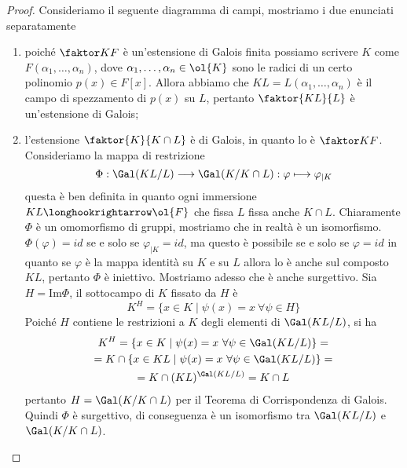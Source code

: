 \documentclass[11pt]{scrartcl}
\begin{document}
	\begin{proof}
		Consideriamo il seguente diagramma di campi, mostriamo i due enunciati separatamente
		\begin{center}
		\end{center}
		\begin{enumerate}[(1)]
			\item poiché $\faktor K F$ è un'estensione di Galois finita possiamo scrivere
			$K$ come $F(\alpha_1, \ldots, \alpha_n)$, dove $\alpha_1, \ldots, \alpha_n \in \ol{K}$
			sono le radici di un certo polinomio $p(x) \in F[x]$. Allora abbiamo che
			$KL = L(\alpha_1, \ldots, \alpha_n)$ è il campo di spezzamento di 
			$p(x)$ su $L$, pertanto $\faktor{KL}{L}$ è un'estensione di Galois;
			\item l'estensione $\faktor{K}{K\cap L}$ è di Galois, in quanto lo è $\faktor K F$. Consideriamo la mappa di restrizione
			\[
			\Phi: \Gal(KL/L) \longrightarrow \Gal(K/K\cap L): \varphi\longmapsto \varphi_{\mid K}
			\]
			questa è ben definita in quanto ogni immersione $KL \longhookrightarrow \ol{F}$
			che fissa $L$ fissa anche $K\cap L$. Chiaramente $\Phi$ è un omomorfismo di gruppi, mostriamo che in realtà è un isomorfismo.
			$\Phi(\varphi) = id$ se e solo se $\varphi_{\mid K} = id$, ma questo è possibile se e solo se $\varphi = id$ in quanto se 
			$\varphi$ è la mappa identità su $K$ e su $L$ allora lo è anche sul composto $KL$, pertanto $\Phi$ è iniettivo. Mostriamo adesso
			che è anche surgettivo. Sia $H = \mathrm{Im}\Phi$, il sottocampo di $K$ fissato da $H$ è
			\[
			K^H = \{x \in K \mid \psi(x) = x~\forall \psi \in H\}
			\]
			Poiché $H$ contiene le restrizioni a $K$ degli elementi di $\Gal(KL/L)$, si ha
			\begin{multline*}
				K^H = \{x \in K \mid \psi(x) = x~\forall \psi \in \Gal(KL/L)\} = \\ = K\cap\{x \in KL \mid \psi(x) = x~\forall \psi \in \Gal(KL/L)\} =\\=
				K \cap (KL)^{\Gal(KL/L)} = K\cap L
			\end{multline*}
			pertanto $H = \Gal(K/K\cap L)$ per il Teorema di Corrispondenza di Galois. Quindi $\Phi$ è surgettivo, di conseguenza è un isomorfismo
			tra $\Gal(KL/L)$ e $\Gal(K/K\cap L)$.
		\end{enumerate}
	\end{proof}
	
\end{document}
